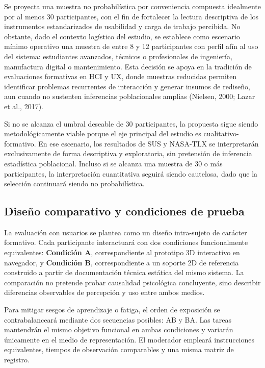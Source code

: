 Se proyecta una muestra no probabil\'istica por conveniencia compuesta idealmente por al menos 30 participantes, con el fin de fortalecer la lectura descriptiva de los instrumentos estandarizados de usabilidad y carga de trabajo percibida. No obstante, dado el contexto log\'istico del estudio, se establece como escenario m\'inimo operativo una muestra de entre 8 y 12 participantes con perfil af\'in al uso del sistema: estudiantes avanzados, t\'ecnicos o profesionales de ingenier\'ia, manufactura digital o mantenimiento. Esta decisi\'on se apoya en la tradici\'on de evaluaciones formativas en HCI y UX, donde muestras reducidas permiten identificar problemas recurrentes de interacci\'on y generar insumos de redise\~no, aun cuando no sustenten inferencias poblacionales amplias (Nielsen, 2000; Lazar et al., 2017).

Si no se alcanza el umbral deseable de 30 participantes, la propuesta sigue siendo metodol\'ogicamente viable porque el eje principal del estudio es cualitativo-formativo. En ese escenario, los resultados de SUS y NASA-TLX se interpretar\'an exclusivamente de forma descriptiva y exploratoria, sin pretensi\'on de inferencia estad\'istica poblacional. Incluso si se alcanza una muestra de 30 o m\'as participantes, la interpretaci\'on cuantitativa seguir\'a siendo cautelosa, dado que la selecci\'on continuar\'a siendo no probabil\'istica.

\subsection{Dise\~no comparativo y condiciones de prueba}

La evaluaci\'on con usuarios se plantea como un dise\~no intra-sujeto de car\'acter formativo. Cada participante interactuar\'a con dos condiciones funcionalmente equivalentes: \textbf{Condici\'on A}, correspondiente al prototipo 3D interactivo en navegador, y \textbf{Condici\'on B}, correspondiente a un soporte 2D de referencia construido a partir de documentaci\'on t\'ecnica est\'atica del mismo sistema. La comparaci\'on no pretende probar causalidad psicol\'ogica concluyente, sino describir diferencias observables de percepci\'on y uso entre ambos medios.

Para mitigar sesgos de aprendizaje o fatiga, el orden de exposici\'on se contrabalancear\'a mediante dos secuencias posibles: AB y BA. Las tareas mantendr\'an el mismo objetivo funcional en ambas condiciones y variar\'an \'unicamente en el medio de representaci\'on. El moderador emplear\'a instrucciones equivalentes, tiempos de observaci\'on comparables y una misma matriz de registro.

